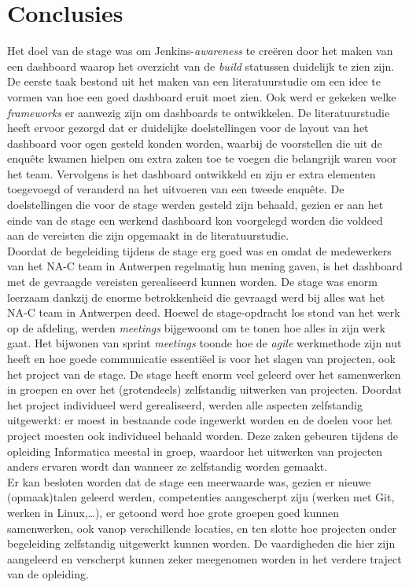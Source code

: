 \documentclass[10pt,a4paper]{article}
\begin{document}
\section{Conclusies}
\label{conclusies}
Het doel van de stage was om Jenkins-\textit{awareness} te cre\"eren door het maken van een dashboard waarop het overzicht van de \textit{build} statussen duidelijk te zien zijn. De eerste taak bestond uit het maken van een literatuurstudie om een idee te vormen van hoe een goed dashboard eruit moet zien. Ook werd er gekeken welke \textit{frameworks} er aanwezig zijn om dashboards te ontwikkelen. De literatuurstudie heeft ervoor gezorgd dat er duidelijke doelstellingen voor de layout van het dashboard voor ogen gesteld konden worden, waarbij de voorstellen die uit de enqu\^ete kwamen hielpen om extra zaken toe te voegen die belangrijk waren voor het team. Vervolgens is het dashboard ontwikkeld en zijn er extra elementen toegevoegd of veranderd na het uitvoeren van een tweede enqu\^ete. De doelstellingen die voor de stage werden gesteld zijn behaald, gezien er aan het einde van de stage een werkend dashboard kon voorgelegd worden die voldeed aan de vereisten die zijn opgemaakt in de literatuurstudie. \\ 
Doordat de begeleiding tijdens de stage erg goed was en omdat de medewerkers van het NA-C team in Antwerpen regelmatig hun mening gaven, is het dashboard met de gevraagde vereisten gerealiseerd kunnen worden.
De stage was enorm leerzaam dankzij de enorme betrokkenheid die gevraagd werd bij alles wat het NA-C team in Antwerpen deed. Hoewel de stage-opdracht los stond van het werk op de afdeling, werden \textit{meetings} bijgewoond om te tonen hoe alles in zijn werk gaat. Het bijwonen van sprint \textit{meetings} toonde hoe de \textit{agile} werkmethode zijn nut heeft en hoe goede communicatie essenti\"eel is voor het slagen van projecten, ook het project van de stage.
De stage heeft enorm veel geleerd over het samenwerken in groepen en over het (grotendeels) zelfstandig uitwerken van projecten. Doordat het project individueel werd gerealiseerd, werden alle aspecten zelfstandig uitgewerkt: er moest in bestaande code ingewerkt worden en de doelen voor het project moesten ook individueel behaald worden. Deze zaken gebeuren tijdens de opleiding Informatica meestal in groep, waardoor het uitwerken van projecten anders ervaren wordt dan wanneer ze zelfstandig worden gemaakt.\\
Er kan besloten worden dat de stage een meerwaarde was, gezien er nieuwe (opmaak)talen geleerd werden, competenties aangescherpt zijn (werken met Git, werken in Linux,\ldots), er getoond werd hoe grote groepen goed kunnen samenwerken, ook vanop verschillende locaties, en ten slotte hoe projecten onder begeleiding zelfstandig uitgewerkt kunnen worden. De vaardigheden die hier zijn aangeleerd en verscherpt kunnen zeker meegenomen worden in het verdere traject van de opleiding.
\end{document}
